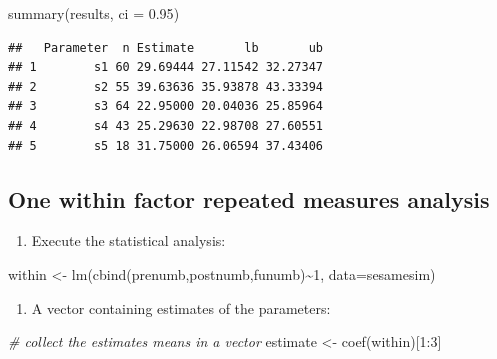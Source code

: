 \documentclass[
]{book}
\newenvironment{Shaded}{\begin{snugshade}}{\end{snugshade}}
\newcommand{\AttributeTok}[1]{\textcolor[rgb]{0.77,0.63,0.00}{#1}}
\newcommand{\CommentTok}[1]{\textcolor[rgb]{0.56,0.35,0.01}{\textit{#1}}}
\newcommand{\DecValTok}[1]{\textcolor[rgb]{0.00,0.00,0.81}{#1}}
\newcommand{\FloatTok}[1]{\textcolor[rgb]{0.00,0.00,0.81}{#1}}
\newcommand{\FunctionTok}[1]{\textcolor[rgb]{0.00,0.00,0.00}{#1}}
\newcommand{\NormalTok}[1]{#1}
\newcommand{\OtherTok}[1]{\textcolor[rgb]{0.56,0.35,0.01}{#1}}
\newcommand{\SpecialCharTok}[1]{\textcolor[rgb]{0.00,0.00,0.00}{#1}}
\providecommand{\tightlist}{%
  \setlength{\itemsep}{0pt}\setlength{\parskip}{0pt}}
\begin{document}
\begin{Shaded}
\begin{Highlighting}[]
\FunctionTok{summary}\NormalTok{(results, }\AttributeTok{ci =} \FloatTok{0.95}\NormalTok{)}
\end{Highlighting}
\end{Shaded}

\begin{verbatim}
##   Parameter  n Estimate       lb       ub
## 1        s1 60 29.69444 27.11542 32.27347
## 2        s2 55 39.63636 35.93878 43.33394
## 3        s3 64 22.95000 20.04036 25.85964
## 4        s4 43 25.29630 22.98708 27.60551
## 5        s5 18 31.75000 26.06594 37.43406
\end{verbatim}

\hypertarget{one-within-factor-repeated-measures-analysis}{%
\subsection{One within factor repeated measures analysis}\label{one-within-factor-repeated-measures-analysis}}

\begin{enumerate}
\def\labelenumi{\arabic{enumi})}
\tightlist
\item
  Execute the statistical analysis:
\end{enumerate}

\begin{Shaded}
\begin{Highlighting}[]
\NormalTok{within }\OtherTok{\textless{}{-}} \FunctionTok{lm}\NormalTok{(}\FunctionTok{cbind}\NormalTok{(prenumb,postnumb,funumb)}\SpecialCharTok{\textasciitilde{}}\DecValTok{1}\NormalTok{, }\AttributeTok{data=}\NormalTok{sesamesim)}
\end{Highlighting}
\end{Shaded}

\begin{enumerate}
\def\labelenumi{\alph{enumi})}
\tightlist
\item
  A vector containing estimates of the parameters:
\end{enumerate}

\begin{Shaded}
\begin{Highlighting}[]
\CommentTok{\# collect the estimates means in a vector}
\NormalTok{estimate }\OtherTok{\textless{}{-}} \FunctionTok{coef}\NormalTok{(within)[}\DecValTok{1}\SpecialCharTok{:}\DecValTok{3}\NormalTok{]}
\end{Highlighting}
\end{Shaded}
\end{document}
